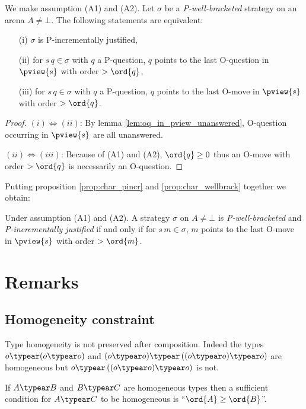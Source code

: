 \begin{proposition}
\label{prop:char_pincr}
\rm We make assumption (A1) and (A2).
Let $\sigma$ be a \emph{P-well-bracketed} strategy on an arena $A\neq \bot$.
The following statements are equivalent:
\begin{enumerate}
\item[(i)] $\sigma$ is P-incrementally justified,
\item[(ii)] for $s \, q \in \sigma$ with $q$ a P-question, $q$ points to the last O-question in $\pview{s}$ with order $>\ord{q}$,
\item[(iii)] for $s \, q \in \sigma$ with $q$ a P-question, $q$ points to the last O-move in $\pview{s}$ with order $>\ord{q}$.
\end{enumerate}
\end{proposition}
\begin{proof}
$(i)\iff(ii)$: By lemma \ref{lem:oq_in_pview_unanswered}, O-question occurring in $\pview{s}$ are all unanswered.

$(ii)\iff(iii)$: Because of (A1) and (A2), $\ord{q} \geq 0$ thus an O-move with order $>\ord{q}$ is necessarily an O-question.
\end{proof}

Putting proposition \ref{prop:char_pincr} and
\ref{prop:char_wellbrack} together we obtain:
\begin{proposition}
Under assumption (A1) and (A2).
A strategy $\sigma$ on $A\neq \bot$
is \emph{P-well-bracketed} and
 \emph{P-incrementally justified} if and only if
for $s \, m \in \sigma$, $m$ points to the last O-move in $\pview{s}$ with order $>\ord{m}$.
\end{proposition}


\section{Remarks}
\subsection{Homogeneity constraint}

Type homogeneity is not preserved after composition. Indeed the types  $o \typear (o \typear o)$ and $(o \typear o) \typear \left((o \typear o) \typear o \right)$ are homogeneous
but $o \typear \left((o \typear o) \typear o\right)$ is not.

If $A\typear B$ and $B \typear C$ are homogeneous types then  a sufficient condition for $A\typear C$ to be homogeneous is  ``$\ord{A} \geq \ord{B}$''.



